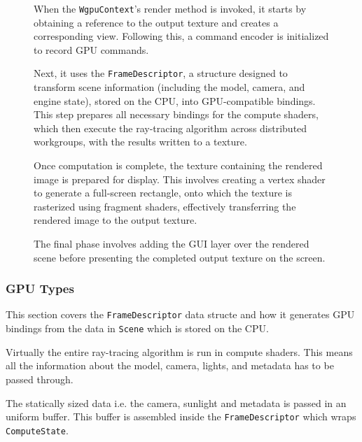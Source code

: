\begin{figure}[H]
\noindent\begin{minipage}[t]{0.65\textwidth}
  \vspace{0.5cm}
  When the \verb|WgpuContext|'s render method is invoked, it starts by obtaining a reference to the output texture and creates a corresponding view. Following this, a command encoder is initialized to record GPU commands.

  Next, it uses the \verb|FrameDescriptor|, a structure designed to transform scene information (including the model, camera, and engine state), stored on the CPU, into GPU-compatible bindings. This step prepares all necessary bindings for the compute shaders, which then execute the ray-tracing algorithm across distributed workgroups, with the results written to a texture.

  Once computation is complete, the texture containing the rendered image is prepared for display. This involves creating a vertex shader to generate a full-screen rectangle, onto which the texture is rasterized using fragment shaders, effectively transferring the rendered image to the output texture.

  The final phase involves adding the GUI layer over the rendered scene before presenting the completed output texture on the screen.

\end{minipage}
\hfill
\begin{minipage}[t]{0.3\textwidth}
  \vspace{-0.5cm}
  \begin{figure}[H]
    \centering
    
  \end{figure}
\end{minipage}
\end{figure}

\subsubsection{GPU Types}
This section covers the \verb|FrameDescriptor| data structe and how it generates GPU bindings from the data in \verb|Scene| which is stored on the CPU.

Virtually the entire ray-tracing algorithm is run in compute shaders. This means all the information about the model, camera, lights, and metadata has to be passed through.

The statically sized data i.e. the camera, sunlight and metadata is passed in an uniform buffer. This buffer is assembled inside the \verb|FrameDescriptor| which wraps \verb|ComputeState|.

